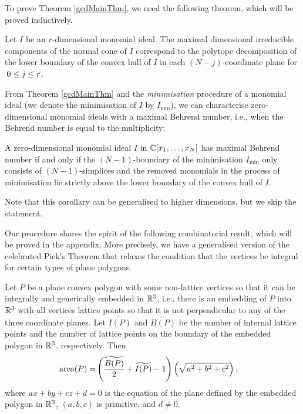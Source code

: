 \documentclass[11pt,a4paper,leqno,noamsfonts]{amsart}
\numberwithin{equation}{section}
\begin{document}
To prove Theorem \ref{gcdMainThm}, we need the following theorem, which will be proved inductively.
\begin{thm} \label{thm: normalconConvexhulldecomposition}
    Let $I$ be an $r$-dimensional monomial ideal. The maximal dimensional irreducible components of the normal cone of $I$ correspond to the polytope decomposition of the lower boundary of the convex hull of $I$ in each $(N-j)$-coordinate plane for $\text{\:}0\leq j \leq r$.
\end{thm}

From Theorem \ref{gcdMainThm} and the \textit{minimisation} procedure of a monomial ideal (we denote the minimisation of $I$ by $I_{\min}$), we can characterise zero-dimensional monomial ideals with a maximal Behrend number, i.e., when the Behrend number is equal to the multiplicity:
  \begin{corollary} 
  A zero-dimensional monomial ideal $I$ in ${\mathbb{C}}[x_1,\ldots,x_N]$ has maximal Behrend number if and only if the $(N-1)$-boundary of the minimisation $I_{\min}$ only consists of $(N-1)$-simplices and the removed monomials in the process of minimisation lie strictly above the lower boundary of the convex hull of $I$.
  \end{corollary}
  Note that this corollary can be generalised to higher dimensions, but we skip the statement. 




Our procedure shares the spirit of the following combinatorial result, which will be proved in the appendix. More precisely, we have a generalised version of the celebrated Pick's Theorem that relaxes the condition that the vertices be integral for certain types of plane polygons.  


\begin{thm} 
    Let $P$ be a plane convex polygon with some non-lattice vertices so that it can be integrally and generically embedded in ${\mathbb{R}}^3$, i.e., there is an embedding of $P$ into ${\mathbb{R}}^3$ with all vertices lattice points so that it is not perpendicular to any of the three coordinate planes.  Let $\widetilde{I(P)}$ and $\widetilde{B(P)}$ be the number of internal lattice points and the number of lattice points on the boundary of the embedded polygon in ${\mathbb{R}}^3$, respectively.  Then
    \begin{align*}
        {\mathrm{area}}(P)=&\left(\frac{\widetilde{B(P)}}{2}+\widetilde{I(P)}-1\right)\left(\sqrt{a^2+b^2+c^2}\right),
    \end{align*}
    where $ax+by+cz+d=0$ is the equation of the plane defined by the embedded polygon in ${\mathbb{R}}^3$, $(a,b,c)$ is primitive, and $d\neq 0$.
\end{thm}
\end{document}
